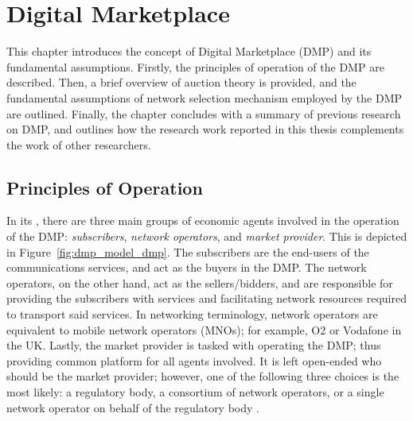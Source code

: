 \chapter{Digital Marketplace} %
\label{cha:dmp}

This chapter introduces the concept of Digital Marketplace (DMP) and its fundamental assumptions. Firstly, the principles of operation of the DMP are described. Then, a brief overview of auction theory is provided, and the fundamental assumptions of network selection mechanism employed by the DMP are outlined. Finally, the chapter concludes with a summary of previous research on DMP, and outlines how the research work reported in this thesis complements the work of other researchers.

\section{Principles of Operation} %
\label{sec:principles_of_operation_dmp}

In its , there are three main groups of economic agents involved in the operation of the DMP: \emph{subscribers}, \emph{network operators}, and \emph{market provider}. This is depicted in Figure~\ref{fig:dmp_model_dmp}. The subscribers are the end-users of the communications services, and act as the buyers in the DMP. The network operators, on the other hand, act as the sellers/bidders, and are responsible for providing the subscribers with services and facilitating network resources required to transport said services. In networking terminology, network operators are equivalent to mobile network operators (MNOs); for example, O2 or Vodafone in the UK. Lastly, the market provider is tasked with operating the DMP; thus providing common platform for all agents involved. It is left open-ended who should be the market provider; however, one of the following three choices is the most likely: a regulatory body, a consortium of network operators, or a single network operator on behalf of the regulatory body \cite{DMLeBodic00,DMIrvine02}.

